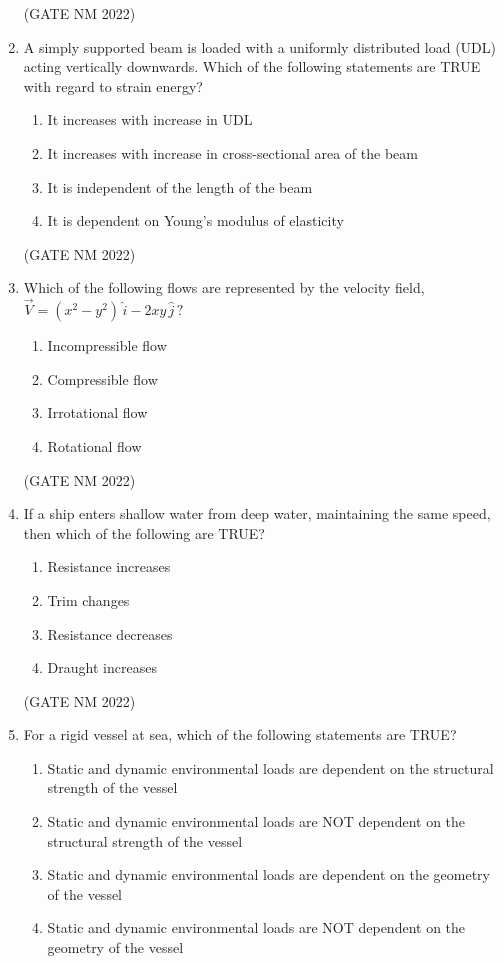 \documentclass[journal,12pt,onecolumn]{IEEEtran}
\theoremstyle{remark}
\begin{document}
\begin{enumerate}
\hfill(GATE NM 2022)

\item  A simply supported beam is loaded with a uniformly distributed load (UDL) acting vertically downwards. Which of the following statements are TRUE with regard to strain energy?
\begin{enumerate}
	\item  It increases with increase in UDL
	\item  It increases with increase in cross-sectional area of the beam
	\item  It is independent of the length of the beam
	\item  It is dependent on Young's modulus of elasticity
\end{enumerate}
\hfill(GATE NM 2022)

\item  Which of the following flows are represented by the velocity field,  
$\vec{V} = (x^2 - y^2)\,\hat{i} - 2xy\,\hat{j} \, ?$
\begin{multicols}{2}
\begin{enumerate}
    \item Incompressible flow
    \item Compressible flow
    \item Irrotational flow
    \item Rotational flow
\end{enumerate}
\end{multicols}

\hfill(GATE NM 2022)

\item  If a ship enters shallow water from deep water, maintaining the same speed, then which of the following are TRUE?
	\begin{multicols}{2}
\begin{enumerate}
    \item Resistance increases
    \item Trim changes
    \item Resistance decreases
    \item Draught increases
\end{enumerate}
	\end{multicols}

\hfill(GATE NM 2022)

\item  For a rigid vessel at sea, which of the following statements are TRUE?
\begin{enumerate}
    \item Static and dynamic environmental loads are dependent on the structural strength of the vessel
    \item Static and dynamic environmental loads are NOT dependent on the structural strength of the vessel
    \item Static and dynamic environmental loads are dependent on the geometry of the vessel
    \item Static and dynamic environmental loads are NOT dependent on the geometry of the vessel
\end{enumerate}


\end{enumerate}
\end{document}
